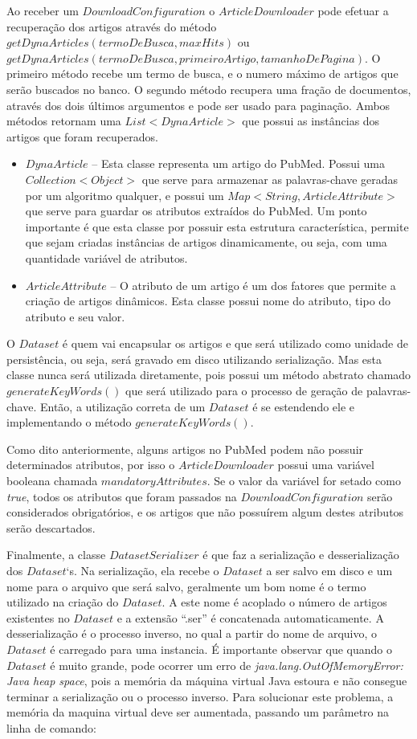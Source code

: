 Ao receber um $DownloadConfiguration$ o $ArticleDownloader$ pode efetuar a recuperação dos artigos através do método $getDynaArticles(termoDeBusca, maxHits)$ ou $getDynaArticles(termoDeBusca, primeiroArtigo, tamanhoDePagina)$. O primeiro método recebe um termo de busca, e o numero máximo de artigos que serão buscados no banco. O segundo método recupera uma fração de documentos, através dos dois últimos argumentos e pode ser usado para paginação. Ambos métodos retornam uma $List<DynaArticle>$ que possui as instâncias dos artigos que foram recuperados.

\begin{itemize}
\item $DynaArticle$ – Esta classe representa um artigo do PubMed. Possui uma
$Collection<Object>$ que serve para armazenar as palavras-chave geradas por um
algoritmo qualquer, e possui um $Map<String, ArticleAttribute>$ que serve para
guardar os atributos extraídos do PubMed. Um ponto importante é que esta classe por
possuir esta estrutura característica, permite que sejam criadas instâncias de artigos
dinamicamente, ou seja, com uma quantidade variável de atributos.

\item $ArticleAttribute$ – O atributo de um artigo é um dos fatores que permite a criação de
artigos dinâmicos. Esta classe possui nome do atributo, tipo do atributo e seu valor.

\end{itemize}
O $Dataset$ é quem vai encapsular os artigos e que será utilizado como unidade de persistência,
ou seja, será gravado em disco utilizando serialização. Mas esta classe nunca será utilizada
diretamente, pois possui um método abstrato chamado $generateKeyWords()$ que será
utilizado para o processo de geração de palavras-chave. Então, a utilização correta de um
$Dataset$ é se estendendo ele e implementando o método $generateKeyWords()$.

Como dito anteriormente, alguns artigos no PubMed podem não possuir determinados atributos, por isso o $ArticleDownloader$ possui uma variável booleana chamada $mandatoryAttributes$. Se o valor da variável for setado como \emph{true}, todos os atributos que foram passados na $DownloadConfiguration$ serão considerados obrigatórios, e os artigos que não possuírem algum destes atributos serão descartados.

Finalmente, a classe $DatasetSerializer$ é que faz a serialização e desserialização dos
$Dataset$`s. Na serialização, ela recebe o $Dataset$ a ser salvo em disco e um nome para o
arquivo que será salvo, geralmente um bom nome é o termo utilizado na criação do $Dataset$. A
este nome é acoplado o número de artigos existentes no $Dataset$ e a extensão “.ser” é
concatenada automaticamente. A desserialização é o processo inverso, no qual a partir do nome
de arquivo, o $Dataset$ é carregado para uma instancia.
É importante observar que quando o $Dataset$ é muito grande, pode ocorrer um erro de
\emph{java.lang.OutOfMemoryError: Java heap space}, pois a memória da máquina virtual Java
estoura e não consegue terminar a serialização ou o processo inverso. Para solucionar este
problema, a memória da maquina virtual deve ser aumentada, passando um parâmetro na linha
de comando:

